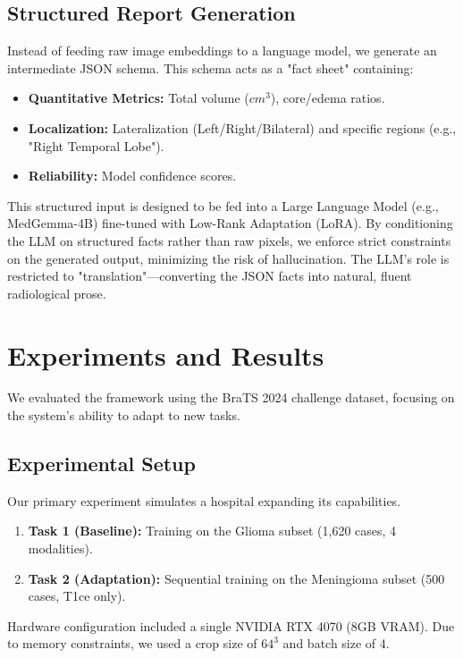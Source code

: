 \documentclass[conference]{IEEEtran}
\begin{document}
\subsection{Structured Report Generation}

Instead of feeding raw image embeddings to a language model, we generate an intermediate JSON schema. This schema acts as a "fact sheet" containing:
\begin{itemize}
    \item \textbf{Quantitative Metrics:} Total volume ($cm^3$), core/edema ratios.
    \item \textbf{Localization:} Lateralization (Left/Right/Bilateral) and specific regions (e.g., "Right Temporal Lobe").
    \item \textbf{Reliability:} Model confidence scores.
\end{itemize}

This structured input is designed to be fed into a Large Language Model (e.g., MedGemma-4B) fine-tuned with Low-Rank Adaptation (LoRA). By conditioning the LLM on structured facts rather than raw pixels, we enforce strict constraints on the generated output, minimizing the risk of hallucination. The LLM's role is restricted to "translation"—converting the JSON facts into natural, fluent radiological prose.

\section{Experiments and Results}

We evaluated the framework using the BraTS 2024 challenge dataset, focusing on the system's ability to adapt to new tasks.

\subsection{Experimental Setup}
Our primary experiment simulates a hospital expanding its capabilities.
\begin{enumerate}
    \item \textbf{Task 1 (Baseline):} Training on the Glioma subset (1,620 cases, 4 modalities).
    \item \textbf{Task 2 (Adaptation):} Sequential training on the Meningioma subset (500 cases, T1ce only).
\end{enumerate}

Hardware configuration included a single NVIDIA RTX 4070 (8GB VRAM). Due to memory constraints, we used a crop size of $64^3$ and batch size of 4.
\end{document}
